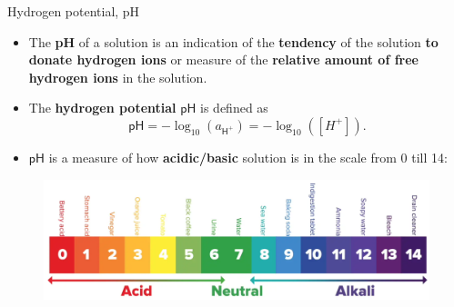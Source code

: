 \begin{frame}{Hydrogen potential, pH}

\begin{itemize}
	\item The \alert{\textbf{pH}} of a solution is an indication of the \textbf{tendency} of the solution \textbf{to donate hydrogen ions}
	or measure of the \textbf{relative amount of free hydrogen ions} in the solution. 
		\pause
	
\item The \alert{\textbf{hydrogen potential}} $\mathsf{pH}$ is defined as
%
\[
\boxed{ 
\mathsf{pH} = - \log_{10} (a_{\mathsf{H^+}}) = - \log_{10} ([H^+]). 
}
\]
%
\vskip -10pt
	\pause
\item $\mathsf{pH}$ is a measure of how \textbf{acidic/basic} solution is in the scale from 0 till 14: 
%
%
\end{itemize}
\begin{figure}
\centering
\includegraphics[width=0.9\columnwidth]{figures/chemical-equilibrium/ph-scale.png}
\end{figure}
\end{frame}
%
%
